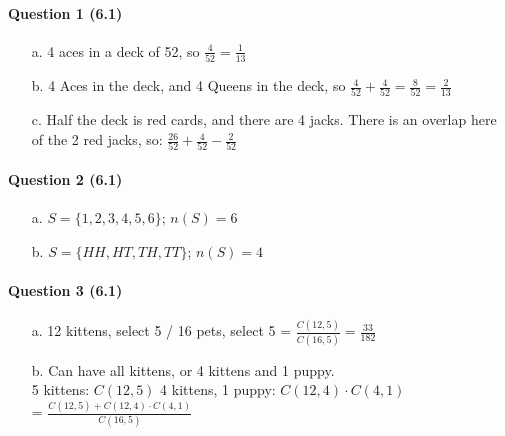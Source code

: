 \documentclass[a4paper,12pt]{book}
\begin{document}
        \paragraph{Question 1 (6.1)}
            \begin{enumerate}
                \item[a.] 4 aces in a deck of 52, so $\frac{4}{52} = \frac{1}{13}$
                \item[b.] 4 Aces in the deck, and 4 Queens in the deck, so $\frac{4}{52} + \frac{4}{52} = \frac{8}{52} = \frac{2}{13}$
                \item[c.] Half the deck is red cards, and there are 4 jacks. There is an overlap
                    here of the 2 red jacks, so:
                    $\frac{26}{52} + \frac{4}{52} - \frac{2}{52}$
            \end{enumerate}
            
        \paragraph{Question 2 (6.1)}
            \begin{enumerate}
                \item[a.] $S = \{ 1, 2, 3, 4, 5, 6 \}$; \tab $n(S) = 6$
                \item[b.] $S = \{ HH, HT, TH, TT \}$; \tab $n(S) = 4$
            \end{enumerate}

        \paragraph{Question 3 (6.1)}
            \begin{enumerate}
                \item[a.] 12 kittens, select 5 / 16 pets, select 5 \tab
                    = $ \frac{C(12,5)}{C(16,5)} = \frac{33}{182} $
                \item[b.] Can have all kittens, or 4 kittens and 1 puppy. \\
                    5 kittens: $C(12,5)$ \tab{}
                    4 kittens, 1 puppy: $C(12,4) \cdot C(4,1)$ \\
                    = $ \frac{C(12,5) + C(12,4) \cdot C(4,1)}{C(16,5)} $
            \end{enumerate}
\end{document}
